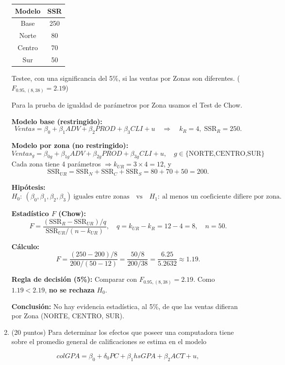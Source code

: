 \documentclass[10pt,a4paper]{article}
\begin{document}
\begin{enumerate}
\begin{center}
    \begin{tabular}{|c|c|}
    \hline
        Modelo & SSR \\
        \hline
        Base & 250 \\
        \hline
        Norte & 80 \\
        \hline
        Centro & 70 \\
        \hline
        Sur & 50 \\
        \hline
    \end{tabular}
\end{center}
Testee, con una significancia del 5\%, si las ventas por Zonas son diferentes. ($F_{0.95,(8,38)}=2.19$)


{\color{blue} Para la prueba de igualdad de parámetros por Zona usamos el Test de Chow.

\textbf{Modelo base (restringido):} 
\[
Ventas=\beta_0+\beta_1 ADV+\beta_2 PROD+\beta_3 CLI+u
\quad\Rightarrow\quad k_R=4,\; \text{SSR}_R=250.
\]

\textbf{Modelo por zona (no restringido):}
\[
Ventas_g=\beta_{0g}+\beta_{1g} ADV+\beta_{2g} PROD+\beta_{3g} CLI+u,\quad g\in\{\text{NORTE,CENTRO,SUR}\}
\]
Cada zona tiene 4 parámetros $\Rightarrow k_{UR}=3\times 4=12$, y 
\[
\text{SSR}_{UR}=\text{SSR}_N+\text{SSR}_C+\text{SSR}_S=80+70+50=200.
\]

\textbf{Hipótesis:} 
\[
H_0:\ (\beta_0,\beta_1,\beta_2,\beta_3)\ \text{iguales entre zonas}
\quad \text{vs}\quad 
H_1:\ \text{al menos un coeficiente difiere por zona.}
\]

\textbf{Estadístico $F$ (Chow):}
\[
F=\frac{(\text{SSR}_R-\text{SSR}_{UR})/q}{\text{SSR}_{UR}/(n-k_{UR})},
\quad 
q=k_{UR}-k_R=12-4=8,\quad n=50.
\]

\textbf{Cálculo:}
\[
F=\frac{(250-200)/8}{200/(50-12)}
=\frac{50/8}{200/38}
=\frac{6.25}{5.2632}
\approx 1.19.
\]

\textbf{Regla de decisión (5\%):} 
Comparar con $F_{0.95,(8,38)}=2.19$. Como $1.19<2.19$, \textbf{no se rechaza} $H_0$.

\textbf{Conclusión:} 
No hay evidencia estadística, al 5\%, de que las ventas difieran por Zona (NORTE, CENTRO, SUR).
}
\item  (20 puntos) Para determinar los efectos que poseer una computadora tiene sobre el promedio general de calificaciones se estima en el modelo

\[
colGPA = \beta_0 + \delta_0 PC + \beta_1 hsGPA + \beta_2 ACT + u,
\]


\end{enumerate}
\end{document}
